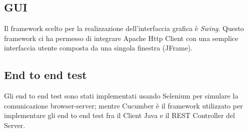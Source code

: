 \subsection{GUI}
Il framework scelto per la realizzazione dell'interfaccia grafica \`e \emph{Swing}. Questo framework ci ha permesso di integrare Apache Http Client con una semplice interfaccia utente composta da una singola finestra (JFrame).
\subsection{End to end test}
Gli end to end test sono stati implementati usando Selenium per simulare la comunicazione browser-server; mentre Cucumber \`e il framework utilizzato per implementare gli end to end test fra il Client Java e il REST Controller del Server.